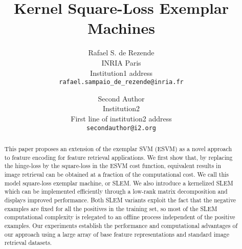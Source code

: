 \documentclass[10pt,twocolumn,letterpaper]{article}
\begin{document}
\title{Kernel Square-Loss Exemplar Machines}

\author{Rafael S. de Rezende\\
INRIA Paris\\
Institution1 address\\
{\tt\small rafael.sampaio_de_rezende@inria.fr}
\and
Second Author\\
Institution2\\
First line of institution2 address\\
{\tt\small secondauthor@i2.org}
}

\maketitle
\begin{abstract}
This paper proposes an extension of the exemplar SVM (ESVM) as a novel approach to feature encoding for feature retrieval applications.
We first show that, by replacing the hinge-loss by the square-loss in the ESVM cost function, equivalent results in image retrieval can be obtained at a fraction of the computational cost. 
We call this model square-loss exemplar machine, or SLEM. 
We also introduce a kernelized SLEM which can be implemented efficiently through a low-rank matrix decomposition and
displays improved performance. 
Both SLEM variants exploit the fact that the negative examples are fixed for all the positives in the training set, so most of the SLEM computational complexity is relegated to an offline process independent of the positive examples. 
Our experiments establish the performance and computational advantages of our approach using a large array of base feature representations and standard image retrieval datasets.
\end{abstract}



%









%



{\small
 

}
\end{document}
